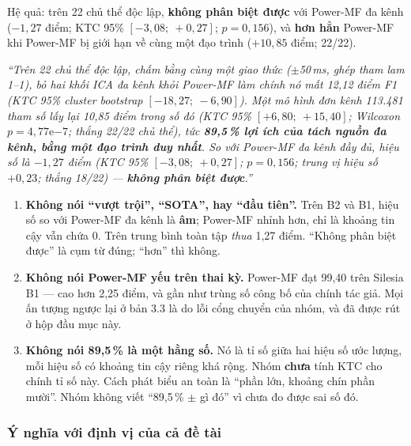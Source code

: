 Hệ quả: trên 22 chủ thể độc lập, \hethong{} \textbf{không phân biệt được} với Power-MF đa kênh
($-1{,}27$ điểm; KTC 95\% $[-3{,}08;\ +0{,}27]$; $p = 0{,}156$), và \textbf{hơn hẳn} Power-MF khi
Power-MF bị giới hạn về cùng một đạo trình ($+10{,}85$ điểm; 22/22).

\begin{ghichu}[title={Phát biểu đúng --- đây là câu nhóm sẽ dùng trong bài báo, nguyên văn}]
\textit{``Trên 22 chủ thể độc lập, chấm bằng cùng một giao thức ($\pm$50\,ms, ghép tham lam 1--1), bỏ
hai khối ICA đa kênh khỏi Power-MF làm chính nó mất 12,12 điểm F1 (KTC 95\% cluster bootstrap
$[-18{,}27;\ -6{,}90]$). Một mô hình đơn kênh 113.481 tham số lấy lại 10,85 điểm trong số đó
(KTC 95\% $[+6{,}80;\ +15{,}40]$; Wilcoxon $p = 4{,}77\mathrm{e}{-7}$; thắng 22/22 chủ thể), tức
\textbf{89,5\,\% lợi ích của tách nguồn đa kênh, bằng một đạo trình duy nhất}. So với Power-MF đa kênh
đầy đủ, hiệu số là $-1{,}27$ điểm (KTC 95\% $[-3{,}08;\ +0{,}27]$; $p = 0{,}156$; trung vị hiệu số
$+0{,}23$; thắng 18/22) --- \textbf{không phân biệt được}.''}
\end{ghichu}

\begin{canhbao}[title={Ba điều KHÔNG được nói kèm phát biểu trên}]
\begin{enumerate}[leftmargin=1.6em,itemsep=4pt]
\item \textbf{Không nói ``vượt trội'', ``SOTA'', hay ``đầu tiên''.} Trên B2 và B1, hiệu số so với
Power-MF đa kênh là \textbf{âm}; Power-MF nhỉnh hơn, chỉ là khoảng tin cậy vẫn chứa 0. Trên trung bình
toàn tập \hethong{} \textit{thua} 1,27 điểm. ``Không phân biệt được'' là cụm từ đúng; ``hơn'' thì không.
\item \textbf{Không nói Power-MF yếu trên thai kỳ.} Power-MF đạt 99,40 trên Silesia B1 --- cao hơn
\hethong{} 2,25 điểm, và gần như trùng số công bố của chính tác giả. Mọi ấn tượng ngược lại ở bản 3.3
là do lỗi cổng chuyển của nhóm, và đã được rút ở hộp đầu mục này.
\item \textbf{Không nói 89,5\,\% là một hằng số.} Nó là tỉ số giữa hai hiệu số ước lượng, mỗi hiệu số có
khoảng tin cậy riêng khá rộng. Nhóm \textbf{chưa} tính KTC cho chính tỉ số này. Cách phát biểu an toàn
là ``phần lớn, khoảng chín phần mười''. Nhóm không viết ``89,5\,\% $\pm$ gì đó'' vì chưa đo được sai số
đó.
\end{enumerate}
\end{canhbao}

\subsubsection{Ý nghĩa với định vị của cả đề tài}

